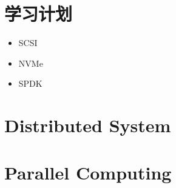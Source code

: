 \section{学习计划}

\begin{itemize}
    \item SCSI
    \item NVMe
    \item SPDK
\end{itemize}

\section{Distributed System}
\section{Parallel Computing}
